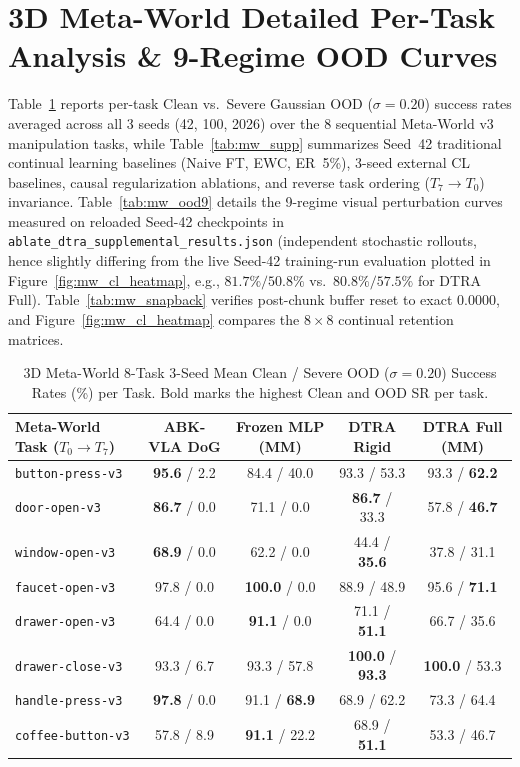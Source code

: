 \documentclass[10pt]{article}
\newcommand{\tblfont}{\fontsize{8.5pt}{10.4pt}\selectfont}
\begin{document}
\clearpage
\section{3D Meta-World Detailed Per-Task Analysis \& 9-Regime OOD Curves}
\label{app:metaworld_details}

Table~\ref{tab:mw_pertask} reports per-task Clean vs.\ Severe Gaussian OOD ($\sigma=0.20$) success rates averaged across all 3 seeds (42, 100, 2026) over the 8 sequential Meta-World v3 manipulation tasks, while Table~\ref{tab:mw_supp} summarizes Seed~42 traditional continual learning baselines (Naive FT, EWC, ER~5\%), 3-seed external CL baselines, causal regularization ablations, and reverse task ordering ($T_7 \to T_0$) invariance. Table~\ref{tab:mw_ood9} details the 9-regime visual perturbation curves measured on reloaded Seed-42 checkpoints in \texttt{ablate\_dtra\_supplemental\_results.json} (independent stochastic rollouts, hence slightly differing from the live Seed-42 training-run evaluation plotted in Figure~\ref{fig:mw_cl_heatmap}, e.g., $81.7\%/50.8\%$ vs.\ $80.8\%/57.5\%$ for DTRA Full). Table~\ref{tab:mw_snapback} verifies post-chunk buffer reset to exact $0.0000$, and Figure~\ref{fig:mw_cl_heatmap} compares the $8\times 8$ continual retention matrices.

\begin{table}[ht!]
  \centering
  \caption{3D Meta-World 8-Task 3-Seed Mean Clean / Severe OOD ($\sigma=0.20$) Success Rates (\%) per Task. Bold marks the highest Clean and OOD SR per task.}
  \label{tab:mw_pertask}
  \tblfont
  \setlength{\tabcolsep}{2.8pt}
  \begin{tabular}{lcccc}
    \toprule
    \textbf{Meta-World Task ($T_0 \to T_7$)} & \textbf{ABK-VLA DoG} & \textbf{Frozen MLP (MM)} & \textbf{DTRA Rigid} & \textbf{DTRA Full (MM)} \\
    \midrule
    \texttt{button-press-v3} & \textbf{95.6} / 2.2 & 84.4 / 40.0 & 93.3 / 53.3 & 93.3 / \textbf{62.2} \\
    \texttt{door-open-v3} & \textbf{86.7} / 0.0 & 71.1 / 0.0 & \textbf{86.7} / 33.3 & 57.8 / \textbf{46.7} \\
    \texttt{window-open-v3} & \textbf{68.9} / 0.0 & 62.2 / 0.0 & 44.4 / \textbf{35.6} & 37.8 / 31.1 \\
    \texttt{faucet-open-v3} & 97.8 / 0.0 & \textbf{100.0} / 0.0 & 88.9 / 48.9 & 95.6 / \textbf{71.1} \\
    \texttt{drawer-open-v3} & 64.4 / 0.0 & \textbf{91.1} / 0.0 & 71.1 / \textbf{51.1} & 66.7 / 35.6 \\
    \texttt{drawer-close-v3} & 93.3 / 6.7 & 93.3 / 57.8 & \textbf{100.0} / \textbf{93.3} & \textbf{100.0} / 53.3 \\
    \texttt{handle-press-v3} & \textbf{97.8} / 0.0 & 91.1 / \textbf{68.9} & 68.9 / 62.2 & 73.3 / 64.4 \\
    \texttt{coffee-button-v3} & 57.8 / 8.9 & \textbf{91.1} / 22.2 & 68.9 / \textbf{51.1} & 53.3 / 46.7 \\
    \bottomrule
  \end{tabular}
\end{table}
\end{document}
